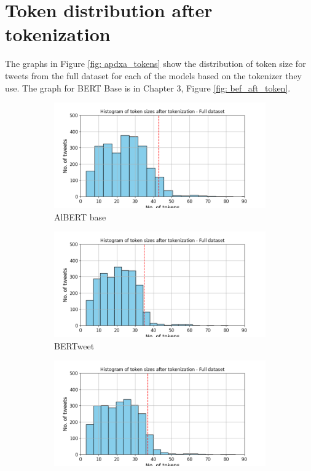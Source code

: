 \section{Token distribution after tokenization}
\label{sec: apdxa_token_dist}
The graphs in Figure \ref{fig: apdxa_tokens} show the distribution of token size for tweets from the full dataset for each of the models based on the tokenizer they use. The graph for BERT Base is in Chapter 3, Figure \ref{fig: bef_aft_token}.
\begin{figure}[htbp]
    \centering
    \captionsetup{font=small}
    \begin{subfigure}[b]{0.48\textwidth}
        \includegraphics[width=\textwidth]{figures/token_pp_hist_albert-base-v2.png}
        \caption{AlBERT base}
        \label{fig: token_pp_hist_albert}
    \end{subfigure}
    \hfill
    \begin{subfigure}[b]{0.48\textwidth}
        \includegraphics[width=\textwidth]{figures/token_pp_hist_vinai-bertweet-base.png}
        \caption{BERTweet}
        \label{fig: token_pp_hist_bertwteet}
    \end{subfigure}
    \begin{subfigure}[b]{0.48\textwidth}
        \includegraphics[width=\textwidth]{figures/token_pp_hist_prajjwal1-bert-tiny.png}

\end{subfigure}
\end{figure}
